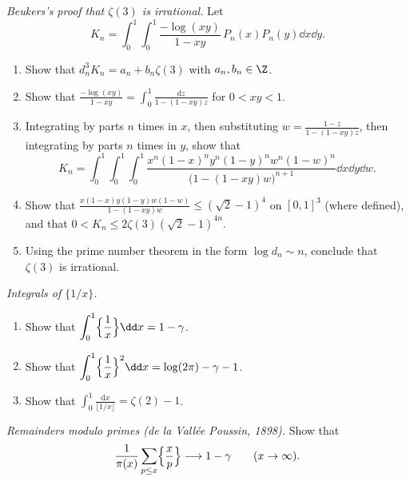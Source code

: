 \begin{exercise}[$\star\star\star$]\label{pb:beukersthree}
\emph{Beukers's proof that $\zeta(3)$ is irrational.} Let
\[
K_n=\int_0^1\!\!\int_0^1\frac{-\log(xy)}{1-xy}\,P_n(x)P_n(y)\dd x\dd y.
\]
\begin{enumerate}[label=(\alph*)]
\item Show that $d_n^3K_n=a_n+b_n\zeta(3)$ with $a_n,b_n\in\Z$.
\item Show that $\frac{-\log(xy)}{1-xy}=\int_0^1\frac{\mathrm dz}{1-(1-xy)z}$ for $0<xy<1$.
\item Integrating by parts $n$ times in $x$, then substituting $w=\frac{1-z}{1-(1-xy)z}$, then integrating by parts $n$ times in $y$, show that
\[
K_n=\int_0^1\!\!\int_0^1\!\!\int_0^1\frac{x^n(1-x)^ny^n(1-y)^nw^n(1-w)^n}{\bigl(1-(1-xy)w\bigr)^{n+1}}\dd x\dd y\dd w.
\]
\item Show that $\frac{x(1-x)y(1-y)w(1-w)}{1-(1-xy)w}\le(\sqrt2-1)^4$ on $[0,1]^3$ (where defined), and that $0<K_n\le2\zeta(3)(\sqrt2-1)^{4n}$.
\item Using the prime number theorem in the form $\log d_n\sim n$, conclude that $\zeta(3)$ is irrational.
\end{enumerate}
\end{exercise}

\begin{exercise}[$\star\star$]\label{pb:fracint}
\emph{Integrals of $\{1/x\}$.}
\begin{enumerate}[label=(\alph*)]
\item Show that $\displaystyle\int_0^1\Bigl\{\frac1x\Bigr\}\dd x=1-\gamma$.
\item Show that $\displaystyle\int_0^1\Bigl\{\frac1x\Bigr\}^2\dd x=\log(2\pi)-\gamma-1$.
\item Show that $\displaystyle\int_0^1\frac{\mathrm dx}{\lfloor1/x\rfloor}=\zeta(2)-1$.
\end{enumerate}
\end{exercise}

\begin{exercise}[$\star\star\star$]\label{pb:primefrac}
\emph{Remainders modulo primes (de la Vallée Poussin, 1898).} Show that
\[
\frac1{\pi(x)}\sum_{p\le x}\Bigl\{\frac xp\Bigr\}\longrightarrow1-\gamma\qquad(x\to\infty).
\]
\end{exercise}

